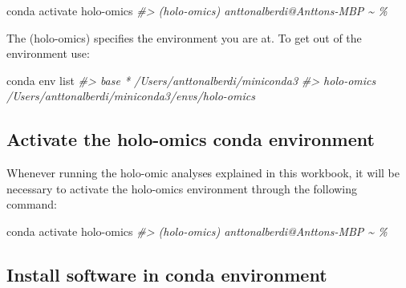 \documentclass[
]{book}
\newenvironment{Shaded}{\begin{snugshade}}{\end{snugshade}}
\newcommand{\CommentTok}[1]{\textcolor[rgb]{0.56,0.35,0.01}{\textit{#1}}}
\newcommand{\ExtensionTok}[1]{#1}
\newcommand{\NormalTok}[1]{#1}
\begin{document}
\small

\begin{Shaded}
\begin{Highlighting}[]
\ExtensionTok{conda}\NormalTok{ activate holo{-}omics}
\CommentTok{\#\textgreater{} (holo{-}omics) anttonalberdi@Anttons{-}MBP \textasciitilde{} \%}
\end{Highlighting}
\end{Shaded}

\normalsize

The (holo-omics) specifies the environment you are at. To get out of the environment use:

\small

\begin{Shaded}
\begin{Highlighting}[]
\ExtensionTok{conda}\NormalTok{ env list}
\CommentTok{\#\textgreater{} base                  *  /Users/anttonalberdi/miniconda3}
\CommentTok{\#\textgreater{} holo{-}omics               /Users/anttonalberdi/miniconda3/envs/holo{-}omics}
\end{Highlighting}
\end{Shaded}

\normalsize

\hypertarget{activate-the-holo-omics-conda-environment}{%
\subsection*{Activate the holo-omics conda environment}\label{activate-the-holo-omics-conda-environment}}

Whenever running the holo-omic analyses explained in this workbook, it will be necessary to activate the holo-omics environment through the following command:

\small

\begin{Shaded}
\begin{Highlighting}[]
\ExtensionTok{conda}\NormalTok{ activate holo{-}omics}
\CommentTok{\#\textgreater{} (holo{-}omics) anttonalberdi@Anttons{-}MBP \textasciitilde{} \%}
\end{Highlighting}
\end{Shaded}

\normalsize

\hypertarget{install-software-in-conda-environment}{%
\subsection*{Install software in conda environment}\label{install-software-in-conda-environment}}
\end{document}
